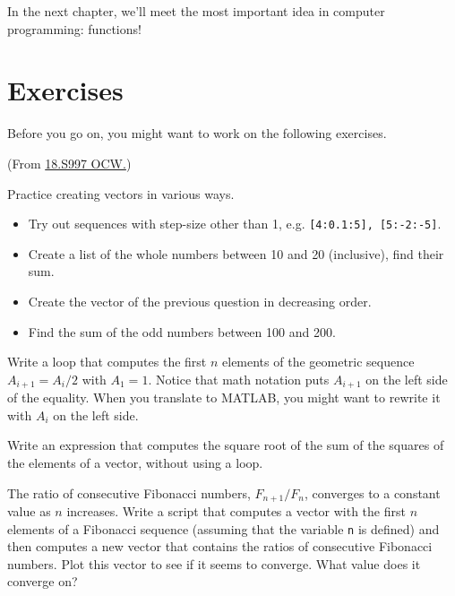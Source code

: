 
In the next chapter, we'll meet the most important idea in computer programming: functions!



\section{Exercises}

Before you go on, you might want to work on the following exercises.

\begin{ex}
(From \href{https://ocw.mit.edu/courses/18-s997-introduction-to-matlab-programming-fall-2011/pages/the-basics/lists-vectors-and-matrices/}{18.S997 OCW.})

Practice creating vectors in various ways.
\begin{itemize}
\item Try out sequences with step-size other than 1, e.g. \lstinline{[4:0.1:5], [5:-2:-5]}.
\item Create a list of the whole numbers between 10 and 20 (inclusive), find their sum.
\item Create the vector of the previous question in decreasing order.
\item Find the sum of the odd numbers between 100 and 200.
\end{itemize}
\end{ex}

\begin{ex}
Write a loop that computes the first $n$ elements
of the geometric sequence $A_{i+1} = A_i/2$ with $A_1 = 1$.  Notice that
math notation puts $A_{i+1}$ on the left side of the equality.
When you translate to MATLAB, you might want to rewrite it with
$A_{i}$ on the left side.
\end{ex}


\begin{ex}
Write an expression that computes the square root of the sum of the squares of the elements of a vector, without using a loop.
\end{ex}



\begin{ex}
\label{fibratio}

The ratio of consecutive Fibonacci numbers, $F_{n+1}/F_{n}$, converges
to a constant value as $n$ increases.  Write a script that computes
a vector with the first $n$ elements of a Fibonacci sequence (assuming
that the variable \lstinline{n} is defined) and then computes a new
vector that contains the ratios of consecutive Fibonacci numbers.
Plot this vector to see if it seems to converge.  What value does
it converge on?


\end{ex}


